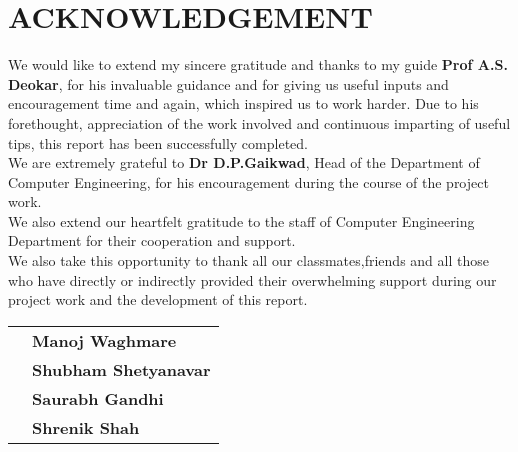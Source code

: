 \chapter*{\Huge\textbf{ACKNOWLEDGEMENT}}

 We would like to extend my sincere gratitude and thanks to my guide \textbf{Prof A.S. Deokar}, for his invaluable guidance and for giving us useful inputs and encouragement time and again, which inspired us to work harder.  Due to his forethought, appreciation of the work involved and continuous imparting of useful tips, this report has been successfully completed.\\

\noindent
We are extremely grateful to \textbf{Dr D.P.Gaikwad}, Head of the Department of Computer Engineering, for his  encouragement during the course of the project work.\\   

\noindent
We also extend our heartfelt gratitude to the staff of Computer Engineering Department for their cooperation and support. \\

\noindent
We also take this opportunity to thank all our classmates,friends and all those who have directly or indirectly provided their overwhelming support during  our project work and the development of this report.\\






\vspace{0.5in}
\begin{tabular}{ll}
 & \hspace{3.5in} \bf Manoj Waghmare\\
 & \hspace{3.5in} \bf Shubham Shetyanavar\\
 & \hspace{3.5in} \bf Saurabh Gandhi\\
 & \hspace{3.5in} \bf Shrenik Shah\\
\end{tabular}